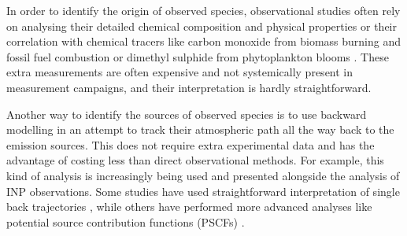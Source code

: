     In order to identify the origin of observed species, observational studies often rely on analysing their detailed chemical composition and physical properties \citep{freitas_emission_2022, heutte_observations_2025, parshintsev_methods_2015, shao_review_2022} or their correlation with chemical tracers like carbon monoxide from biomass burning and fossil fuel combustion \citep{jiang_aerosol-co_2009} or dimethyl sulphide from phytoplankton blooms \citep{park_observational_2017}.
    These extra measurements are often expensive and not systemically present in measurement campaigns, and their interpretation is hardly straightforward.

    Another way to identify the sources of observed species is to use backward modelling in an attempt to track their atmospheric path all the way back to the emission sources.
    This does not require extra experimental data and has the advantage of costing less than direct observational methods.
    For example, this kind of analysis is increasingly being used and presented alongside the analysis of INP observations. Some studies have used straightforward interpretation of single back trajectories \citep{allen_evidence_2021, hartmann_wintertime_2020, hartmann_terrestrial_2021, porter_highly_2022, wex_annual_2019, yun_ice_2022}, while others have performed more advanced analyses like potential source contribution functions (PSCFs) \citep{irish_ice_2019, si_concentrations_2019}.


